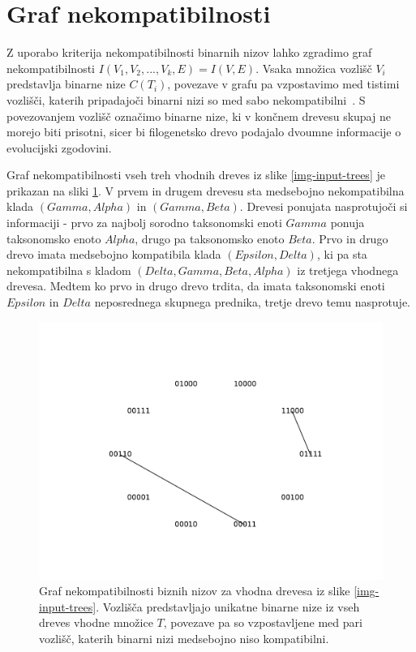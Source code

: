 \documentclass[a4paper, 12pt]{book}
\begin{document}
\section{Graf nekompatibilnosti}
Z uporabo kriterija nekompatibilnosti binarnih nizov lahko zgradimo graf nekompatibilnosti $I(V_1, V_2, ..., V_k, E) = I(V, E)$. Vsaka množica vozlišč $V_i$ predstavlja binarne nize $C(T_i)$, povezave v grafu pa vzpostavimo med tistimi vozlišči, katerih pripadajoči binarni nizi so med sabo nekompatibilni~\cite{pw}. S povezovanjem vozlišč označimo binarne nize, ki v končnem drevesu skupaj ne morejo biti prisotni, sicer bi filogenetsko drevo podajalo dvoumne informacije o evolucijski zgodovini. 

Graf nekompatibilnosti vseh treh vhodnih dreves iz slike \ref{img-input-trees} je prikazan na sliki \ref{img-incompat-graph-example}. V prvem in drugem drevesu sta medsebojno nekompatibilna klada $(Gamma, Alpha)$ in $(Gamma, Beta)$. Drevesi ponujata nasprotujoči si informaciji - prvo za najbolj sorodno taksonomski enoti $Gamma$ ponuja taksonomsko enoto $Alpha$, drugo pa taksonomsko enoto $Beta$. Prvo in drugo drevo imata medsebojno kompatibila klada $(Epsilon, Delta)$, ki pa sta nekompatibilna s kladom $(Delta, Gamma, Beta, Alpha)$ iz tretjega vhodnega drevesa. Medtem ko prvo in drugo drevo trdita, da imata taksonomski enoti $Epsilon$ in $Delta$ neposrednega skupnega prednika, tretje drevo temu nasprotuje.

\begin{figure}
	\begin{center}
		\includegraphics[scale=0.7, clip=true, trim=2cm 2cm 2cm 2cm]{gfx/incompat_graph.pdf}
	\end{center}
	\caption{Graf nekompatibilnosti biznih nizov za vhodna drevesa iz slike \ref{img-input-trees}. Vozlišča predstavljajo unikatne binarne nize iz vseh dreves vhodne množice $T$, povezave pa so vzpostavljene med pari vozlišč, katerih binarni nizi medsebojno niso kompatibilni.}
	\label{img-incompat-graph-example}
\end{figure}
\end{document}
